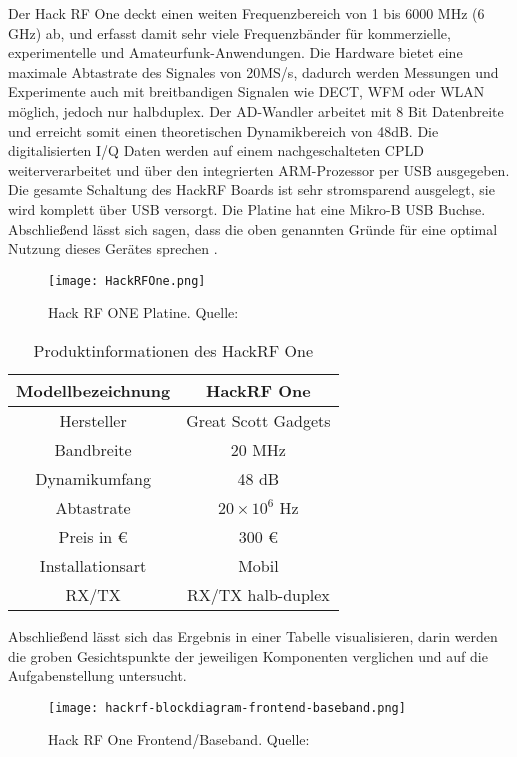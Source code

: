 Der Hack RF One deckt einen weiten Frequenzbereich von 1 bis 6000 MHz (6 GHz) ab, und erfasst damit sehr viele Frequenzbänder für kommerzielle, experimentelle und Amateurfunk-Anwendungen. Die Hardware bietet eine maximale Abtastrate des Signales von 20MS/s, dadurch werden Messungen und Experimente auch mit breitbandigen Signalen wie DECT, WFM oder WLAN möglich, jedoch nur halbduplex. Der AD-Wandler arbeitet mit 8 Bit Datenbreite und erreicht somit einen theoretischen Dynamikbereich von 48dB. Die digitalisierten I/Q Daten werden auf einem nachgeschalteten CPLD weiterverarbeitet und über den integrierten ARM-Prozessor per USB ausgegeben. Die gesamte Schaltung des HackRF Boards ist sehr stromsparend ausgelegt, sie wird komplett über USB versorgt. Die Platine hat eine Mikro-B USB Buchse. Abschließend lässt sich sagen, dass die oben genannten Gründe für eine optimal Nutzung dieses Gerätes sprechen \cite{wimo:2018}.\\
\begin{figure}[H]
	\centering
	\texttt{[image: HackRFOne.png]}
	\caption[Hack RF ONE Platine]{Hack RF ONE Platine. Quelle: \cite{HackRFOne:2018}} 
	\label{HackRFOne}
\end{figure}




\begin{table}[ht]
	\centering
	\begin{tabular}{c|c}
		Modellbezeichnung & HackRF One  \\
		\hline
		Hersteller & Great Scott Gadgets\\ 
		\hline 
		Bandbreite & 20 MHz \\ 
		\hline 
		Dynamikumfang & 48 dB \\ %
		\hline 
		Abtastrate & \( 20 \times 10^{6} \) Hz \\ 
		\hline 
		Preis in \euro &  300 \euro\\ 
		\hline 
		Installationsart & Mobil \\ 
		\hline 
		RX/TX & RX/TX halb-duplex \\ 
	\end{tabular} 
	\caption{Produktinformationen des HackRF One}
\end{table}

Abschließend lässt sich das Ergebnis in einer Tabelle visualisieren, darin werden die groben Gesichtspunkte der jeweiligen Komponenten verglichen und auf die Aufgabenstellung untersucht.\\


\begin{figure}[ht]
	\centering
	\texttt{[image: hackrf-blockdiagram-frontend-baseband.png]}
	\caption[Hack RF One Frontend/Baseband]{Hack RF One Frontend/Baseband. Quelle: \cite{hackrf-wiki:2016}} 
	\label{HackRFOne-Blockschaltbild}
\end{figure}
